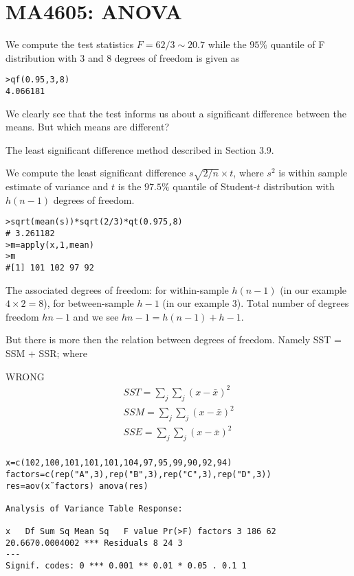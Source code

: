 



\section{MA4605: ANOVA}
We compute the test statistics $F = 62/3 \sim 20.7$ while the
$95\%$ quantile of F distribution with 3 and 8 degrees of freedom
is given as
\begin{verbatim}
>qf(0.95,3,8)
4.066181
\end{verbatim}

We clearly see that the test informs us about a significant
difference between the means. But which means are different?

The least significant difference method described in Section 3.9.

We compute the least significant difference $s \sqrt{2/n} \times
t$, where $s^{2}$ is within sample estimate of variance and $t$ is
the $97.5\%$ quantile of Student-$t$ distribution with $h(n-1)$
degrees of freedom.

\begin{verbatim}
>sqrt(mean(s))*sqrt(2/3)*qt(0.975,8)
# 3.261182
>m=apply(x,1,mean)
>m
#[1] 101 102 97 92
\end{verbatim}

The associated degrees of freedom: for within-sample $h(n - 1)$
(in our example $4 \times 2 = 8$), for between-sample $h - 1$ (in
our example 3). Total number of degrees freedom $hn-1$ and we see
$hn - 1 = h(n-1) + h - 1$.

But there is more then the relation between degrees of freedom.
Namely SST = SSM + SSR; where

WRONG
\begin{eqnarray}
SST = \sum_{j}\sum_{j}(x-\bar{x})^2\\
SSM= \sum_{j}\sum_{j}(x-\bar{x})^2\\
SSE = \sum_{j}\sum_{j}(x-\bar{x})^2\\
\end{eqnarray}


\begin{verbatim}
x=c(102,100,101,101,101,104,97,95,99,90,92,94)
factors=c(rep("A",3),rep("B",3),rep("C",3),rep("D",3))
res=aov(x˜factors) anova(res)

Analysis of Variance Table Response:

x   Df Sum Sq Mean Sq   F value Pr(>F) factors 3 186 62
20.6670.0004002 *** Residuals 8 24 3
---
Signif. codes: 0 *** 0.001 ** 0.01 * 0.05 . 0.1 1
\end{verbatim}
\newpage


